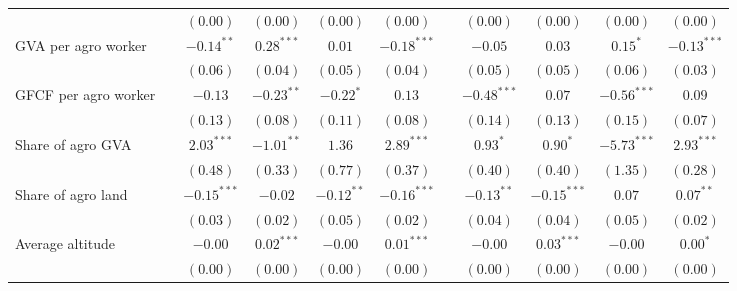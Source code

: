 \begin{table}
\begin{center}
\begin{tabular}{l c c c c c c c c c c}
                                  &               & $(0.00)$      & $(0.00)$      & $(0.00)$      & $(0.00)$       &               & $(0.00)$      & $(0.00)$      & $(0.00)$      & $(0.00)$      \\
GVA per agro worker               &               & $-0.14^{**}$  & $0.28^{***}$  & $0.01$        & $-0.18^{***}$  &               & $-0.05$       & $0.03$        & $0.15^{*}$    & $-0.13^{***}$ \\
                                  &               & $(0.06)$      & $(0.04)$      & $(0.05)$      & $(0.04)$       &               & $(0.05)$      & $(0.05)$      & $(0.06)$      & $(0.03)$      \\
GFCF per agro worker              &               & $-0.13$       & $-0.23^{**}$  & $-0.22^{*}$   & $0.13$         &               & $-0.48^{***}$ & $0.07$        & $-0.56^{***}$ & $0.09$        \\
                                  &               & $(0.13)$      & $(0.08)$      & $(0.11)$      & $(0.08)$       &               & $(0.14)$      & $(0.13)$      & $(0.15)$      & $(0.07)$      \\
Share of agro GVA                 &               & $2.03^{***}$  & $-1.01^{**}$  & $1.36$        & $2.89^{***}$   &               & $0.93^{*}$    & $0.90^{*}$    & $-5.73^{***}$ & $2.93^{***}$  \\
                                  &               & $(0.48)$      & $(0.33)$      & $(0.77)$      & $(0.37)$       &               & $(0.40)$      & $(0.40)$      & $(1.35)$      & $(0.28)$      \\
Share of agro land                &               & $-0.15^{***}$ & $-0.02$       & $-0.12^{**}$  & $-0.16^{***}$  &               & $-0.13^{**}$  & $-0.15^{***}$ & $0.07$        & $0.07^{**}$   \\
                                  &               & $(0.03)$      & $(0.02)$      & $(0.05)$      & $(0.02)$       &               & $(0.04)$      & $(0.04)$      & $(0.05)$      & $(0.02)$      \\
Average altitude                  &               & $-0.00$       & $0.02^{***}$  & $-0.00$       & $0.01^{***}$   &               & $-0.00$       & $0.03^{***}$  & $-0.00$       & $0.00^{*}$    \\
                                  &               & $(0.00)$      & $(0.00)$      & $(0.00)$      & $(0.00)$       &               & $(0.00)$      & $(0.00)$      & $(0.00)$      & $(0.00)$      \\

\end{tabular}
\end{center}
\end{table}
